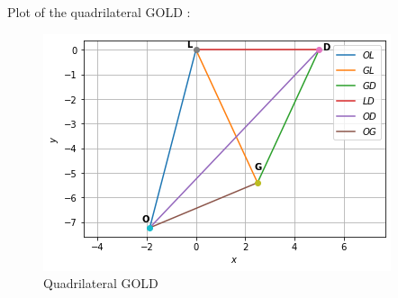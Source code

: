 \documentclass[journal,12pt,twocolumn]{IEEEtran}
\begin{document}
\begin{enumerate}
Plot of the quadrilateral GOLD :
\begin{figure}[ht]
    \centering
    \includegraphics[width=\columnwidth]{QUADFIGURE.png}
    \caption{Quadrilateral GOLD}
    \label{fig:Quadrilateral GOLD}
\end{figure}
\end{enumerate}
\end{document}
